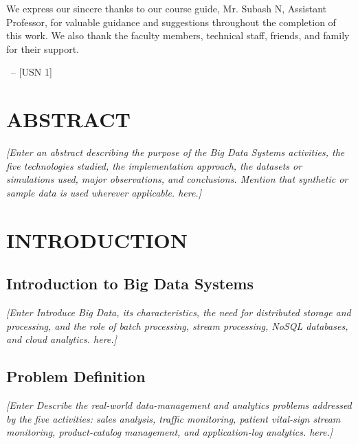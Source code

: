 \documentclass[12pt,a4paper]{report}
\newcommand{\StudentOne}{[NAME 1]}
\newcommand{\USNOne}{[USN 1]}
\newcommand{\GuideOne}{Mr. Subash N}
\newcommand{\GuideDesignation}{Assistant Professor}
\newcommand{\placeholder}[1]{\textit{[Enter #1 here.]}}
\begin{document}
We express our sincere thanks to our course guide, \GuideOne,
\GuideDesignation, for valuable guidance and suggestions throughout
the completion of this work. We also thank the faculty members,
technical staff, friends, and family for their support.

\vspace{1cm}
\begin{flushright}
\StudentOne\ -- \USNOne\\

\end{flushright}

\clearpage

\chapter*{ABSTRACT}

\placeholder{an abstract describing the purpose of the Big Data Systems
activities, the five technologies studied, the implementation approach,
the datasets or simulations used, major observations, and conclusions.
Mention that synthetic or sample data is used wherever applicable.}

\clearpage

\tableofcontents
\clearpage
\listoffigures
{}
\clearpage
\listoftables
{}
\clearpage


\chapter{INTRODUCTION}

\section{Introduction to Big Data Systems}
\placeholder{Introduce Big Data, its characteristics, the need for
distributed storage and processing, and the role of batch processing,
stream processing, NoSQL databases, and cloud analytics.}

\section{Problem Definition}
\placeholder{Describe the real-world data-management and analytics
problems addressed by the five activities: sales analysis, traffic
monitoring, patient vital-sign stream monitoring, product-catalog
management, and application-log analytics.}
\end{document}
